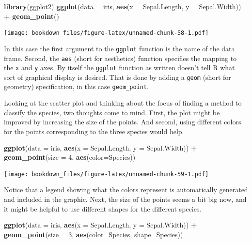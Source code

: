 \documentclass[]{krantz}
\makeatletter
\newenvironment{Shaded}{\begin{snugshade}}{\end{snugshade}}
\newcommand{\KeywordTok}[1]{\textcolor[rgb]{0.27,0.27,0.27}{\textbf{#1}}}
\newcommand{\DataTypeTok}[1]{\textcolor[rgb]{0.27,0.27,0.27}{#1}}
\newcommand{\DecValTok}[1]{\textcolor[rgb]{0.06,0.06,0.06}{#1}}
\newcommand{\StringTok}[1]{\textcolor[rgb]{0.5,0.5,0.5}{#1}}
\newcommand{\OperatorTok}[1]{\textcolor[rgb]{0.43,0.43,0.43}{\textbf{#1}}}
\newcommand{\NormalTok}[1]{#1}
\newenvironment{kframe}{%
\medskip{}
\setlength{\fboxsep}{.8em}
 \def\at@end@of@kframe{}%
 \ifinner\ifhmode%
  \def\at@end@of@kframe{\end{minipage}}%
  \begin{minipage}{\columnwidth}%
 \fi\fi%
 \def\FrameCommand##1{\hskip\@totalleftmargin \hskip-\fboxsep
 \colorbox{shadecolor}{##1}\hskip-\fboxsep
     \hskip-\linewidth \hskip-\@totalleftmargin \hskip\columnwidth}%
 \MakeFramed {\advance\hsize-\width
   \@totalleftmargin\z@ \linewidth\hsize
   \@setminipage}}%
 {\par\unskip\endMakeFramed%
 \at@end@of@kframe}
\renewenvironment{Shaded}{\begin{kframe}}{\end{kframe}}
\makeatother
\begin{document}
\begin{Shaded}
\begin{Highlighting}[]
\KeywordTok{library}\NormalTok{(ggplot2)}
\KeywordTok{ggplot}\NormalTok{(}\DataTypeTok{data =}\NormalTok{ iris, }\KeywordTok{aes}\NormalTok{(}\DataTypeTok{x =}\NormalTok{ Sepal.Length, }\DataTypeTok{y =}\NormalTok{ Sepal.Width)) }\OperatorTok{+}\StringTok{ }
\StringTok{    }\KeywordTok{geom_point}\NormalTok{()}
\end{Highlighting}
\end{Shaded}

\texttt{[image: bookdown\_files/figure-latex/unnamed-chunk-58-1.pdf]}

In this case the first argument to the \texttt{ggplot} function is the
name of the data frame. Second, the \texttt{aes} (short for aesthetics)
function specifies the mapping to the \texttt{x} and \texttt{y} axes. By
itself the \texttt{ggplot} function as written doesn't tell R what sort
of graphical display is desired. That is done by adding a \texttt{geom}
(short for geometry) specification, in this case \texttt{geom\_point}.

Looking at the scatter plot and thinking about the focus of finding a
method to classify the species, two thoughts come to mind. First, the
plot might be improved by increasing the size of the points. And second,
using different colors for the points corresponding to the three species
would help.

\begin{Shaded}
\begin{Highlighting}[]
\KeywordTok{ggplot}\NormalTok{(}\DataTypeTok{data =}\NormalTok{ iris, }\KeywordTok{aes}\NormalTok{(}\DataTypeTok{x =}\NormalTok{ Sepal.Length, }\DataTypeTok{y =}\NormalTok{ Sepal.Width)) }\OperatorTok{+}\StringTok{ }
\StringTok{    }\KeywordTok{geom_point}\NormalTok{(}\DataTypeTok{size =} \DecValTok{4}\NormalTok{, }\KeywordTok{aes}\NormalTok{(}\DataTypeTok{color=}\NormalTok{Species))}
\end{Highlighting}
\end{Shaded}

\texttt{[image: bookdown\_files/figure-latex/unnamed-chunk-59-1.pdf]}

Notice that a legend showing what the colors represent is automatically
generated and included in the graphic. Next, the size of the points
seems a bit big now, and it might be helpful to use different shapes for
the different species.

\begin{Shaded}
\begin{Highlighting}[]
\KeywordTok{ggplot}\NormalTok{(}\DataTypeTok{data =}\NormalTok{ iris, }\KeywordTok{aes}\NormalTok{(}\DataTypeTok{x =}\NormalTok{ Sepal.Length, }\DataTypeTok{y =}\NormalTok{ Sepal.Width)) }\OperatorTok{+}\StringTok{ }
\StringTok{    }\KeywordTok{geom_point}\NormalTok{(}\DataTypeTok{size =} \DecValTok{3}\NormalTok{, }\KeywordTok{aes}\NormalTok{(}\DataTypeTok{color=}\NormalTok{Species, }\DataTypeTok{shape=}\NormalTok{Species))}
\end{Highlighting}
\end{Shaded}
\end{document}
